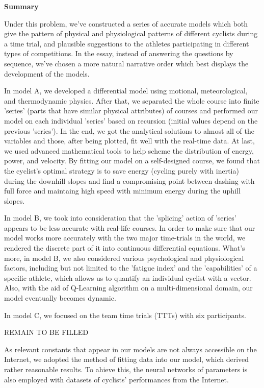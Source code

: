\documentclass{article}
\begin{document}
	\normalfont{}\selectfont
    \begin{center}
        \textbf{\large Summary}

    \end{center}

	Under this problem, we've constructed a series of accurate models which both give the pattern of physical and physiological patterns of different cyclists during a time trial, and plausible suggestions to the athletes participating in different types of competitions. In the essay, instead of answering the questions by sequence, we've chosen a more natural narrative order which best displays the development of the models.

	In model A, we developed a differential model using motional, meteorological, and thermodynamic physics. After that, we separated the whole course into finite 'series' (parts that have similar physical attributes) of courses and performed our model on each individual 'series' based on recursion (initial values depend on the previous 'series'). In the end, we got the analytical solutions to almost all of the variables and those, after being plotted, fit well with the real-time data. At last, we used advanced mathematical tools to help scheme the distribution of energy, power, and velocity. By fitting our model on a self-designed course, we found that the cyclist's optimal strategy is to save energy (cycling purely with inertia) during the downhill slopes and find a compromising point between dashing with full force and maintaing high speed with minimum energy during the uphill slopes.

	In model B, we took into consideration that the 'splicing' action of 'series' appears to be less accurate with real-life courses. In order to make sure that our model works more accurately with the two major time-trials in the world, we rendered the discrete part of it into continuous differential equations. What's more, in model B, we also considered various psychological and physiological factors, including but not limited to the 'fatigue index' and the 'capabilities' of a specific athlete, which allows us to quantify an individual cyclist with a vector. Also, with the aid of Q-Learning algorithm on a multi-dimensional domain, our model eventually becomes dynamic.

	In model C, we focused on the team time trials (TTTs) with six participants.

	\Huge REMAIN TO BE FILLED \normalsize

	As relevant constants that appear in our models are not always accessible on the Internet, we adopted the method of fitting data into our model, which derived rather reasonable results. To ahieve this, the neural networks of parameters is also employed with datasets of cyclists' performances from the Internet.
\end{document}
